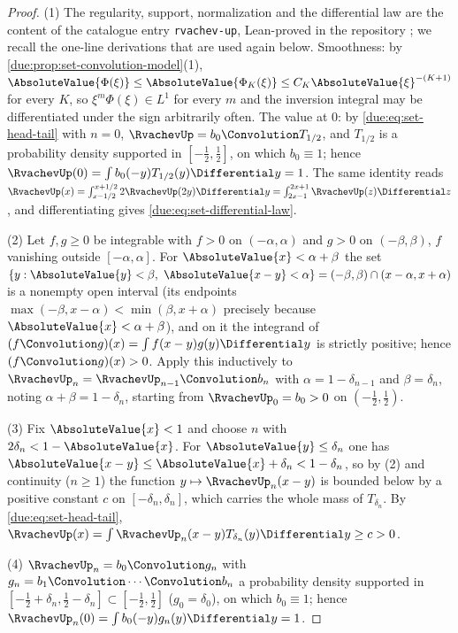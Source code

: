 \documentclass[11pt,oneside]{article}
\theoremstyle{plain}
\theoremstyle{definition}
\theoremstyle{remark}
\newcommand{\upn}[1]{\RvachevUp_{#1}}
\newcommand{\Phin}[1]{\Phi_{#1}}                            %
\newcommand{\PhiUp}{\Phi}                                   %
\begin{document}
\begin{proof}
(1) The regularity, support, normalization and the differential law are the
content of the catalogue entry \texttt{rvachev-up}, Lean-proved in the
repository \cite{proveit-primary}; we recall the one-line derivations that
are used again below.  Smoothness: by
\cref{due:prop:set-convolution-model}(1),
$\AbsoluteValue{\PhiUp(\xi)}\le\AbsoluteValue{\Phin{K}(\xi)}
\le C_K\AbsoluteValue{\xi}^{-(K+1)}$ for every $K$, so
$\xi^{m}\PhiUp(\xi)\in L^{1}$ for every $m$ and the inversion integral may
be differentiated under the sign arbitrarily often.  The value at $0$:
by \cref{due:eq:set-head-tail} with $n=0$, $\RvachevUp=b_0\Convolution T_{1/2}$,
and $T_{1/2}$ is a probability density supported in
$[-\frac12,\frac12]$, on which $b_0\equiv1$; hence
$\RvachevUp(0)=\int b_0(-y)T_{1/2}(y)\Differential y=1$.  The same identity
reads $\RvachevUp(x)=\int_{x-1/2}^{x+1/2}2\RvachevUp(2y)\Differential y
=\int_{2x-1}^{2x+1}\RvachevUp(z)\Differential z$, and differentiating
gives \cref{due:eq:set-differential-law}.

(2) Let $f,g\ge0$ be integrable with $f>0$ on $(-\alpha,\alpha)$ and $g>0$
on $(-\beta,\beta)$, $f$ vanishing outside $[-\alpha,\alpha]$.  For
$\AbsoluteValue{x}<\alpha+\beta$ the set
$\{y:\AbsoluteValue{y}<\beta,\ \AbsoluteValue{x-y}<\alpha\}
=(-\beta,\beta)\cap(x-\alpha,x+\alpha)$ is a nonempty open interval (its
endpoints $\max(-\beta,x-\alpha)<\min(\beta,x+\alpha)$ precisely because
$\AbsoluteValue{x}<\alpha+\beta$), and on it the integrand of
$(f\Convolution g)(x)=\int f(x-y)g(y)\Differential y$ is strictly positive;
hence $(f\Convolution g)(x)>0$.  Apply this inductively to
$\upn{n}=\upn{n-1}\Convolution b_n$ with $\alpha=1-\delta_{n-1}$ and
$\beta=\delta_n$, noting $\alpha+\beta=1-\delta_n$, starting from
$\upn{0}=b_0>0$ on $(-\frac12,\frac12)$.

(3) Fix $\AbsoluteValue{x}<1$ and choose $n$ with $2\delta_n<1-\AbsoluteValue{x}$.
For $\AbsoluteValue{y}\le\delta_n$ one has
$\AbsoluteValue{x-y}\le\AbsoluteValue{x}+\delta_n<1-\delta_n$, so by (2) and
continuity ($n\ge1$) the function $y\mapsto\upn{n}(x-y)$ is bounded below
by a positive constant $c$ on $[-\delta_n,\delta_n]$, which carries the
whole mass of $T_{\delta_n}$.  By \cref{due:eq:set-head-tail},
$\RvachevUp(x)=\int\upn{n}(x-y)T_{\delta_n}(y)\Differential y\ge c>0$.

(4) $\upn{n}=b_0\Convolution g_n$ with
$g_n=b_1\Convolution\cdots\Convolution b_n$ a probability density supported
in $[-\frac12+\delta_n,\frac12-\delta_n]\subset[-\frac12,\frac12]$
($g_0=\delta_0$), on which $b_0\equiv1$; hence
$\upn{n}(0)=\int b_0(-y)g_n(y)\Differential y=1$.
\end{proof}
\end{document}
